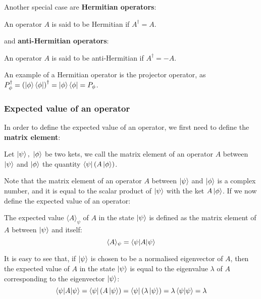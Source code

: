 Another special case are \textbf{Hermitian operators}:

\begin{definition}
    An operator $A$ is said to be Hermitian if $A^\dagger = A$.
\end{definition}

and \textbf{anti-Hermitian operators}:
\begin{definition}
    An operator $A$ is said to be anti-Hermitian if $A^\dagger = -A$.
\end{definition}

An example of a Hermitian operator is the projector operator, as $P_\phi^\dagger = \left(\ket{\phi}\bra{\phi}\right)^\dagger = \ket{\phi}\bra{\phi} = P_\phi$.

\subsubsection{Expected value of an operator}

In order to define the expected value of an operator, we first need to define the \textbf{matrix element}:

\begin{definition}
    Let $\ket{\psi}, \ \ket{\phi}$ be two kets, we call the matrix element of an operator $A$ between $\ket{\psi}$ and $\ket{\phi}$ the quantity $\bra{\psi}(A\ket{\phi})$. 
\end{definition}

Note that the matrix element of an operator $A$ between $\ket{\psi}$ and $\ket{\phi}$ is a complex number, and it is equal to the scalar product of $\ket{\psi}$ with the ket $A\ket{\phi}$. If we now define the expected value of an operator:

\begin{definition}
    The expected value $\langle A \rangle_\psi$ of $A$ in the state $\ket{\psi}$ is defined as the matrix element of $A$ between $\ket{\psi}$ and itself:
    \begin{equation}
        \langle A \rangle_\psi = \braket{\psi|A|\psi}
    \end{equation}
\end{definition}

It is easy to see that, if $\ket{\psi}$ is chosen to be a normalised eigenvector of $A$, then the expected value of $A$ in the state $\ket{\psi}$ is equal to the eigenvalue $\lambda$ of $A$ corresponding to the eigenvector $\ket{\psi}$:
\begin{equation}
    \braket{\psi|A|\psi} = \bra{\psi} (A \ket{\psi}) = \bra{\psi} (\lambda \ket{\psi}) = \lambda\braket{\psi|\psi} = \lambda
\end{equation}

